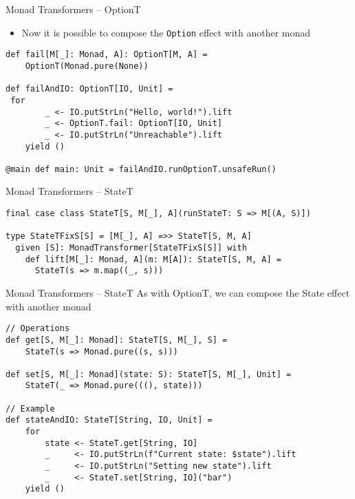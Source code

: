 \documentclass[presentation, 10pt]{beamer}\mode<presentation>{\usetheme{AMSBolognaFC}}
\begin{document}
\begin{frame}[fragile]{Monad Transformers -- OptionT}
\begin{itemize}
	\item Now it is possible to compose the \texttt{Option} effect with another monad
\end{itemize}
\begin{tcolorbox}
\begin{verbatim}
def fail[M[_]: Monad, A]: OptionT[M, A] = 
	OptionT(Monad.pure(None)) 

def failAndIO: OptionT[IO, Unit] = 
 for 
 		_ <- IO.putStrLn("Hello, world!").lift 
		_ <- OptionT.fail: OptionT[IO, Unit] 
		_ <- IO.putStrLn("Unreachable").lift 
	yield ()	

@main def main: Unit = failAndIO.runOptionT.unsafeRun()
\end{verbatim}
\end{tcolorbox}
\end{frame}
\begin{frame}[fragile]{Monad Transformers -- StateT}
\begin{center}	
\begin{tcolorbox}
\begin{verbatim}
final case class StateT[S, M[_], A](runStateT: S => M[(A, S)])

type StateTFixS[S] = [M[_], A] =>> StateT[S, M, A]
  given [S]: MonadTransformer[StateTFixS[S]] with
    def lift[M[_]: Monad, A](m: M[A]): StateT[S, M, A] =
      StateT(s => m.map((_, s)))
\end{verbatim}
\end{tcolorbox}
\end{center}
\end{frame}
\begin{frame}[fragile]{Monad Transformers -- StateT}
As with OptionT, we can compose the State effect with another monad
\begin{tcolorbox}
\begin{verbatim}
// Operations
def get[S, M[_]: Monad]: StateT[S, M[_], S] =
	StateT(s => Monad.pure((s, s)))

def set[S, M[_]: Monad](state: S): StateT[S, M[_], Unit] =
	StateT(_ => Monad.pure(((), state)))

// Example
def stateAndIO: StateT[String, IO, Unit] =
	for
		state <- StateT.get[String, IO]
		_     <- IO.putStrLn(f"Current state: $state").lift
		_     <- IO.putStrLn("Setting new state").lift
		_     <- StateT.set[String, IO]("bar")
	yield ()
\end{verbatim}
\end{tcolorbox}
\end{frame}
\end{document}
